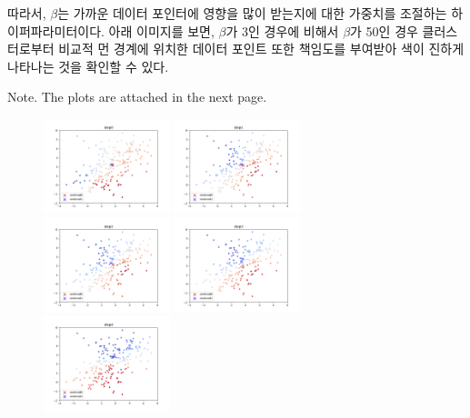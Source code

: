 \documentclass[a4paper]{article}
\begin{document}
\noindent
따라서, $\beta$는 가까운 데이터 포인터에 영향을 많이 받는지에 대한 가중치를 조절하는 하이퍼파라미터이다. 아래 이미지를 보면, $\beta$가 3인 경우에 비해서 $\beta$가 50인 경우 클러스터로부터 비교적 먼 경계에 위치한 데이터 포인트 또한 책임도를 부여받아 색이 진하게 나타나는 것을 확인할 수 있다.

\bigskip
\noindent
Note. The plots are attached in the next page.

\pagebreak

\begin{figure}[h!]
    \centering
    \includegraphics[width=0.327\textwidth]{../ai_assn4_prog/results/2D_soft beta=3/step0.png}
    \includegraphics[width=0.327\textwidth]{../ai_assn4_prog/results/2D_soft beta=3/step1.png}
    \includegraphics[width=0.327\textwidth]{../ai_assn4_prog/results/2D_soft beta=3/step2.png}
    \includegraphics[width=0.327\textwidth]{../ai_assn4_prog/results/2D_soft beta=3/step3.png}
    \includegraphics[width=0.327\textwidth]{../ai_assn4_prog/results/2D_soft beta=3/step4.png}

\end{figure}
\end{document}
